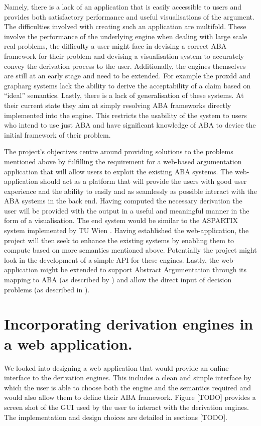 Namely, there is a lack of an application that is easily accessible to users and provides both satisfactory performance and useful visualisations of the argument. The difficulties involved with creating such an application are multifold.  These involve the performance of the underlying engine when dealing with large scale real problems, the difficulty a user might face in devising a correct ABA framework for their problem and devising a visualisation system to accurately convey the derivation process to the user. Additionally, the engines themselves are still at an early stage and need to be extended. For example the proxdd and grapharg systems lack the ability to derive the acceptability of a claim based on ``ideal'' semantics. Lastly, there is a lack of generalisation of these systems. At their current state they aim at simply resolving ABA frameworks directly implemented into the engine. This restricts the usability of the system to users who intend to use just ABA and have significant knowledge of ABA to device the initial framework of their problem.

The project's objectives centre around providing solutions to the problems mentioned above by fulfilling the requirement for a web-based argumentation application that will allow users to exploit the existing ABA systems. The web-application should act as a platform that will provide the users with good user experience and the ability to easily and as seamlessly as possible interact with the ABA systems in the back end. Having computed the necessary derivation the user will be provided with the output in a useful and meaningful manner in the form of a visualisation. The end system would be similar to the ASPARTIX system implemented by TU Wien \cite{aspartix}. Having established the web-application, the project will then seek to enhance the existing systems by enabling them to compute based on more semantics mentioned above. Potentially the project might look in the development of a simple API for these engines. Lastly, the web-application might be extended to support Abstract Argumentation through its mapping to ABA (as described by \cite{AAmapping}) and allow the direct input of decision problems (as described in \cite{decision}). 

\section{Incorporating derivation engines in a web application.}

We looked into designing a web application that would provide an online interface to the derivation engines. This includes a clean and simple interface by which the user is able to choose both the engine and the semantics required and would also allow them to define their ABA framework. Figure [TODO] provides a screen shot of the GUI used by the user to interact with the derivation engines. The implementation and design choices are detailed in sections [TODO].

